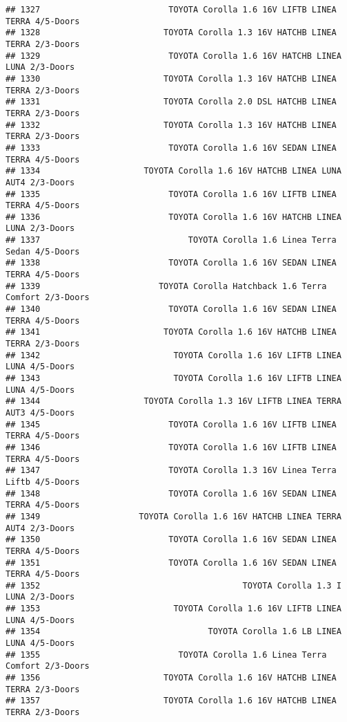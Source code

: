 \documentclass[]{article}
\begin{document}
\begin{verbatim}
## 1327                          TOYOTA Corolla 1.6 16V LIFTB LINEA TERRA 4/5-Doors
## 1328                         TOYOTA Corolla 1.3 16V HATCHB LINEA TERRA 2/3-Doors
## 1329                          TOYOTA Corolla 1.6 16V HATCHB LINEA LUNA 2/3-Doors
## 1330                         TOYOTA Corolla 1.3 16V HATCHB LINEA TERRA 2/3-Doors
## 1331                         TOYOTA Corolla 2.0 DSL HATCHB LINEA TERRA 2/3-Doors
## 1332                         TOYOTA Corolla 1.3 16V HATCHB LINEA TERRA 2/3-Doors
## 1333                          TOYOTA Corolla 1.6 16V SEDAN LINEA TERRA 4/5-Doors
## 1334                     TOYOTA Corolla 1.6 16V HATCHB LINEA LUNA AUT4 2/3-Doors
## 1335                          TOYOTA Corolla 1.6 16V LIFTB LINEA TERRA 4/5-Doors
## 1336                          TOYOTA Corolla 1.6 16V HATCHB LINEA LUNA 2/3-Doors
## 1337                              TOYOTA Corolla 1.6 Linea Terra Sedan 4/5-Doors
## 1338                          TOYOTA Corolla 1.6 16V SEDAN LINEA TERRA 4/5-Doors
## 1339                        TOYOTA Corolla Hatchback 1.6 Terra Comfort 2/3-Doors
## 1340                          TOYOTA Corolla 1.6 16V SEDAN LINEA TERRA 4/5-Doors
## 1341                         TOYOTA Corolla 1.6 16V HATCHB LINEA TERRA 2/3-Doors
## 1342                           TOYOTA Corolla 1.6 16V LIFTB LINEA LUNA 4/5-Doors
## 1343                           TOYOTA Corolla 1.6 16V LIFTB LINEA LUNA 4/5-Doors
## 1344                     TOYOTA Corolla 1.3 16V LIFTB LINEA TERRA AUT3 4/5-Doors
## 1345                          TOYOTA Corolla 1.6 16V LIFTB LINEA TERRA 4/5-Doors
## 1346                          TOYOTA Corolla 1.6 16V LIFTB LINEA TERRA 4/5-Doors
## 1347                          TOYOTA Corolla 1.3 16V Linea Terra Liftb 4/5-Doors
## 1348                          TOYOTA Corolla 1.6 16V SEDAN LINEA TERRA 4/5-Doors
## 1349                    TOYOTA Corolla 1.6 16V HATCHB LINEA TERRA AUT4 2/3-Doors
## 1350                          TOYOTA Corolla 1.6 16V SEDAN LINEA TERRA 4/5-Doors
## 1351                          TOYOTA Corolla 1.6 16V SEDAN LINEA TERRA 4/5-Doors
## 1352                                         TOYOTA Corolla 1.3 I LUNA 2/3-Doors
## 1353                           TOYOTA Corolla 1.6 16V LIFTB LINEA LUNA 4/5-Doors
## 1354                                  TOYOTA Corolla 1.6 LB LINEA LUNA 4/5-Doors
## 1355                            TOYOTA Corolla 1.6 Linea Terra Comfort 2/3-Doors
## 1356                         TOYOTA Corolla 1.6 16V HATCHB LINEA TERRA 2/3-Doors
## 1357                         TOYOTA Corolla 1.6 16V HATCHB LINEA TERRA 2/3-Doors

\end{verbatim}
\end{document}
